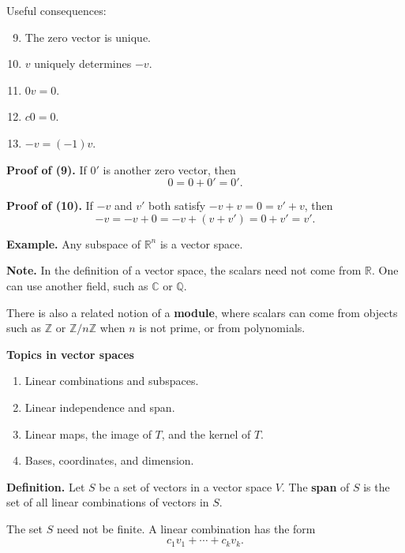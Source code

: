 \documentclass[letterpaper]{article}
\begin{document}
\medskip

Useful consequences:
\begin{enumerate}
\setcounter{enumi}{8}
\item The zero vector is unique.
\item $v$ uniquely determines $-v$.
\item $0v=0$.
\item $c0=0$.
\item $-v=(-1)v$.
\end{enumerate}

\medskip

\textbf{Proof of (9).} If $0'$ is another zero vector, then
\[
0=0+0'=0'.
\]

\textbf{Proof of (10).} If $-v$ and $v'$ both satisfy $-v+v=0=v'+v$, then
\[
-v=-v+0=-v+(v+v')=0+v'=v'.
\]

\newpage

\textbf{Example.} Any subspace of $\mathbb{R}^n$ is a vector space.

\medskip

\textbf{Note.} In the definition of a vector space, the scalars need not come from $\mathbb{R}$. One can use another field, such as $\mathbb{C}$ or $\mathbb{Q}$.

\medskip

There is also a related notion of a \textbf{module}, where scalars can come from objects such as $\mathbb{Z}$ or $\mathbb{Z}/n\mathbb{Z}$ when $n$ is not prime, or from polynomials.

\bigskip

\textbf{Topics in vector spaces}
\begin{enumerate}
\item Linear combinations and subspaces.
\item Linear independence and span.
\item Linear maps, the image of $T$, and the kernel of $T$.
\item Bases, coordinates, and dimension.
\end{enumerate}

\newpage

\textbf{Definition.} Let $S$ be a set of vectors in a vector space $V$. The \textbf{span} of $S$ is the set of all linear combinations of vectors in $S$.

\medskip

The set $S$ need not be finite. A linear combination has the form
\[
c_1v_1+\cdots+c_kv_k.
\]

\medskip
\end{document}
